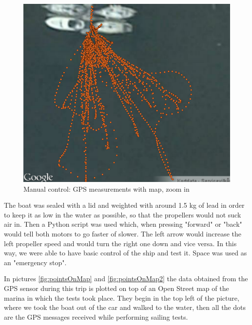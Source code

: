 \begin{figure}[htpb]
	\centering
	\includegraphics[width=\textwidth]{img/maidenVoyage/pointsOnMapZoom}
	\caption{Manual control: GPS measurements with map, zoom in} 
	\label{fig:pointsOnMap2}
\end{figure}

The boat was sealed with a lid and weighted with around 1.5 kg of lead in order to keep it as low in the water as possible, so that the propellers would not suck air in. Then a Python script was used which, when pressing "forward" or "back" would tell both motors to go faster of slower. The left arrow would increase the left propeller speed and would turn the right one down and vice versa. In this way, we were able to have basic control of the ship and test it. Space was used as an "emergency stop".

In pictures \vref{fig:pointsOnMap} and \vref{fig:pointsOnMap2} the data obtained from the GPS sensor during this trip is plotted on top of an Open Street map of the marina in which the tests took place. They begin in the top left of the picture, where we took the boat out of the car and walked to the water, then all the dots are the GPS messages received while performing sailing tests.

